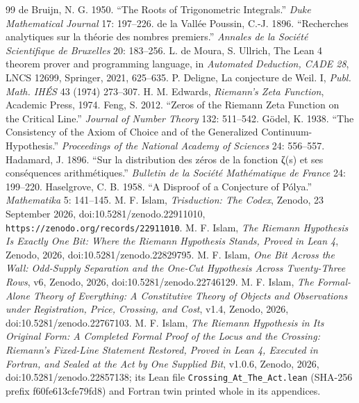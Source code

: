 \documentclass[10pt]{article}
\begin{document}
\begin{thebibliography}{99}
 de Bruijn, N. G. 1950. ``The Roots of Trigonometric Integrals.'' \emph{Duke Mathematical Journal} 17: 197--226.
 de la Vallée Poussin, C.-J. 1896. ``Recherches analytiques sur la théorie des nombres premiers.'' \emph{Annales de la Société Scientifique de Bruxelles} 20: 183--256.
 L. de Moura, S. Ullrich, The Lean 4 theorem prover and programming language, in \emph{Automated Deduction, CADE 28}, LNCS 12699, Springer, 2021, 625--635.
 P. Deligne, La conjecture de Weil. I, \emph{Publ. Math. IH\'ES} 43 (1974) 273--307.
 H. M. Edwards, \emph{Riemann's Zeta Function}, Academic Press, 1974.
 Feng, S. 2012. ``Zeros of the Riemann Zeta Function on the Critical Line.'' \emph{Journal of Number Theory} 132: 511--542.
 Gödel, K. 1938. ``The Consistency of the Axiom of Choice and of the Generalized Continuum-Hypothesis.'' \emph{Proceedings of the National Academy of Sciences} 24: 556--557.
 Hadamard, J. 1896. ``Sur la distribution des zéros de la fonction ζ(s) et ses conséquences arithmétiques.'' \emph{Bulletin de la Société Mathématique de France} 24: 199--220.
 Haselgrove, C. B. 1958. ``A Disproof of a Conjecture of Pólya.'' \emph{Mathematika} 5: 141--145.
 M. F. Islam, \emph{Trisduction: The Codex}, Zenodo, 23 September 2026, doi:10.5281/zenodo.22911010, \texttt{https://zenodo.org/records/22911010}.
 M. F. Islam, \emph{The Riemann Hypothesis Is Exactly One Bit: Where the Riemann Hypothesis Stands, Proved in Lean 4}, Zenodo, 2026, doi:10.5281/zenodo.22829795.
 M. F. Islam, \emph{One Bit Across the Wall: Odd-Supply Separation and the One-Cut Hypothesis Across Twenty-Three Rows}, v6, Zenodo, 2026, doi:10.5281/zenodo.22746129.
 M. F. Islam, \emph{The Formal-Alone Theory of Everything: A Constitutive Theory of Objects and Observations under Registration, Price, Crossing, and Cost}, v1.4, Zenodo, 2026, doi:10.5281/zenodo.22767103.
 M. F. Islam, \emph{The Riemann Hypothesis in Its Original Form: A Completed Formal Proof of the Locus and the Crossing: Riemann's Fixed-Line Statement Restored, Proved in Lean 4, Executed in Fortran, and Sealed at the Act by One Supplied Bit}, v1.0.6, Zenodo, 2026, doi:10.5281/zenodo.22857138; its Lean file \texttt{Crossing\_\allowbreak At\_\allowbreak The\_\allowbreak Act.lean} (SHA-256 prefix f60fe613cfe79fd8) and Fortran twin printed whole in its appendices.

\end{thebibliography}
\end{document}
